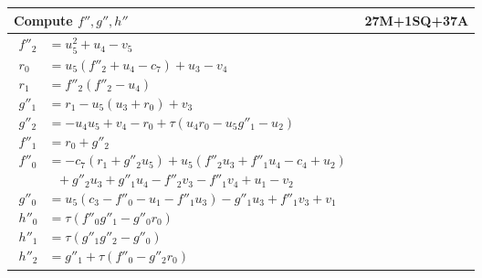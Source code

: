 \pagebreak
\begin{tabularx}{\linewidth}{|Xr|}
  \hline
    Compute $f'', g'', h''$ & 27M+1SQ+37A \\
  \hline
  {\begin{align*}
    f''_2 &= u_5^2 + u_4 - v_5 \\
    r_0   &= u_5(f''_2 + u_4 - c_7) + u_3 - v_4 \\
    r_1   &= f''_2(f''_2 - u_4) \\
    g''_1 &= r_1 - u_5(u_3 + r_0) + v_3 \\
    g''_2 &= -u_4u_5 + v_4 - r_0 + \tau(u_4r_0 - u_5g''_1 - u_2) \\
    f''_1 &= r_0 + g''_2 \\
    f''_0 &= -c_7(r_1 + g''_2u_5) + u_5(f''_2u_3 + f''_1u_4 - c_4 + u_2) \\
          &~~~ + g''_2u_3 + g''_1u_4 - f''_2v_3 - f''_1v_4 + u_1 - v_2 \\
    g''_0 &= u_5(c_3 - f''_0 - u_1 - f''_1u_3) - g''_1u_3 + f''_1v_3 + v_1 \\
    h''_0 &= \tau(f''_0g''_1 - g''_0r_0) \\
    h''_1 &= \tau(g''_1g''_2 - g''_0) \\
    h''_2 &= g''_1 + \tau(f''_0 - g''_2r_0)
  \end{align*}} & \\
  \hline
\end{tabularx}


